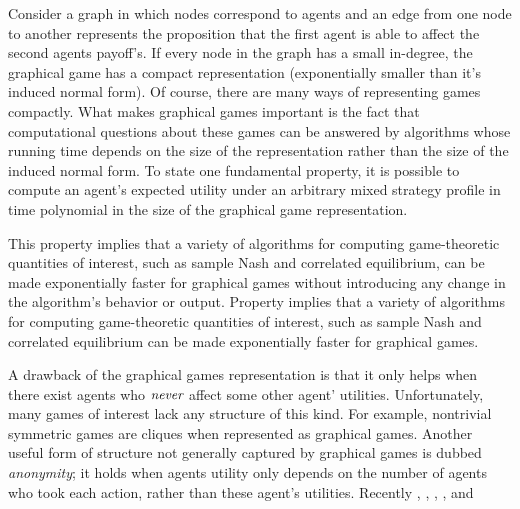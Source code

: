Consider a graph in which nodes correspond to agents and an edge from one node to another represents the proposition that the first agent is able to affect the second agents payoff's. If every node in the graph has a small in-degree, the graphical game has a compact representation (exponentially smaller than it's induced normal form). Of course, there are many ways of representing games compactly. What makes graphical games important is the fact that computational questions about these games can be answered by algorithms whose running time depends on the size of the representation rather than the size of the induced normal form. To state one fundamental property, it is possible to compute an agent's expected utility under an arbitrary mixed strategy profile in time polynomial in the size of the graphical game representation. 

This property implies that a variety of algorithms for computing game-theoretic quantities of interest, such as sample Nash and correlated equilibrium, can be made exponentially faster for graphical games without introducing any change in the algorithm's behavior or output. Property implies that a variety of algorithms for computing game-theoretic quantities of interest, such as sample Nash and correlated equilibrium can be made exponentially faster for graphical games.

A drawback of the graphical games representation is that it only helps when there exist agents who $\emph{never}$ affect some other agent' utilities. Unfortunately, many games of interest lack any structure of this kind. For example, nontrivial symmetric games are cliques when represented as graphical games. Another useful form of structure not generally captured by graphical games is dubbed \emph{anonymity}; it holds when agents utility only depends on the number of agents who took each action, rather than these agent's utilities. Recently \citet{PR-2008}, \citet{KV-200}, \citet{DP-2008}, \citet{BFH-2011}, and 